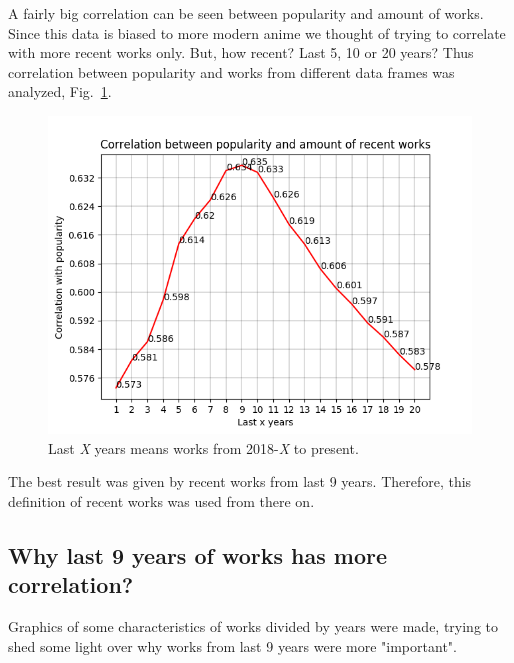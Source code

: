 A fairly big correlation can be seen between popularity and amount of works. Since this data is biased to more modern anime we thought of trying to correlate with more recent works only. But, how recent? Last 5, 10 or 20 years? Thus correlation between popularity and works from different data frames was analyzed, Fig.~\ref{fig:correlationPopRecentWorks}.

\begin{figure}[!h]
	\begin{center}
	\includegraphics[width=\columnwidth]{graphics/correlationPopRecentWorks.png}
	\caption{Last \textit{X} years means works from 2018-\textit{X} to present.}
	\label{fig:correlationPopRecentWorks}
	\end{center}
\end{figure}

The best result was given by recent works from last 9 years. Therefore, this definition of recent works was used from there on.

\FloatBarrier
\subsection{Why last 9 years of works has more correlation?}
Graphics of some characteristics of works divided by years were made, trying to shed some light over why works from last 9 years were more "important". 

